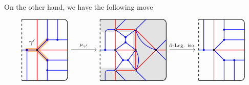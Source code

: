 On the other hand, we have the following move
\[
\begin{tikzcd}[column sep=3pc]
\begin{tikzpicture}[baseline=-.5ex, scale=0.5]
\draw[thick, dashed] (-0.5, 3) -- (-0.5, -3);
\draw[thick, rounded corners=5] (-0.5, 3) -- (4, 3) -- (4, -3) -- (-0.5, -3);
\clip[rounded corners=5] (-0.5, 3) -- (4, 3) -- (4, -3) -- (-0.5, -3);
\draw[cyclecolor1, opacity=0.5, line width=5, line cap=round] (1,0) -- (2,1) (1,0) -- (2,-1) (1,0) -- (0,0) node[midway, above, black, opacity=1] {$\cycle'$};
\draw[blue, thick, fill] (0, 0) circle (2pt) -- (0, -3);
\draw[red, thick] (1, 3) -- (1, -3);
\draw[red, thick] (1,0) -- (4, 0);
\draw[blue, thick, fill] 
(-0.5,0) -- (1, 0)
(1,0) -- ++(1, 1) circle (2pt) ++(0,0) -- +(0, 2) ++(0,0) -- ++(1,0) circle (2pt) -- +(0,2) ++(0,0) -- +(1,0)
(1,0) -- ++(1, -1) circle (2pt) ++(0,0) -- +(2,0) ++(0,0) -- ++(0,-1) circle (2pt) -- +(2,0) ++(0,0) -- ++(0,-1)
;
\draw[fill=white, thick] (1,0) circle (2pt);
\end{tikzpicture}
\arrow[r, "\mutation_{\cycle'}"] &
\begin{tikzpicture}[baseline=-.5ex, scale=0.5]
\draw[thick, dashed] (-0.5, 3) -- (-0.5, -3);
\draw[thick, rounded corners=5] (-0.5, 3) -- (6, 3) -- (6, -3) -- (-0.5, -3);
\clip[rounded corners=5] (-0.5, 3) -- (6, 3) -- (6, -3) -- (-0.5, -3);
\fill[opacity=0.1, rounded corners] (-1, 1.75) -- (2.75, 1.75) -- (2.75, -1.75) -- (-1, -1.75) -- (-1, -4) -- (7,-4) -- (7, 4) -- (-1, 4) -- cycle;
\draw[thick, red] 
(1,3) -- (1,2) rectangle (3,0) rectangle (1,-2) -- (1,-3)
(3,2) -- (5,0) -- (3,-2)
(5,0) -- (6,0)
;
\draw[thick, blue, fill]
(-0.5, 0) -- (0,0) circle (2pt) -- (1,0)
(1,2) -- ++(2,2)
(3,2) -- ++(2,2)
(5,0) -- ++(2,2)
(5,0) -- ++(2,-2)
(3,-2) -- ++(2,-2)
(1,-2) -- ++(2,-2)
(1,2) -- (2, 1.25) circle (2pt) -- (3, 2)
(2,1.25) -- (2, 0.75)
(1,0) -- (2, 0.75) circle (2pt) -- (3, 0)
(1,0) -- (1.75, -1) circle (2pt) -- (1, -2)
(1.75, -1) -- (2.25, -1)
(3,0) -- (2.25, -1) circle (2pt) -- (3,-2)
;
\draw[thick, blue, rounded corners] 
(0,0) -- (0, 2) -- (1,2)
(0, -4) -- (0, -2) -- (1, -2)
(3, -2) to[out=60,in=-60] (3,0)
(3, 2) to[out=-75, in=165] (5,0)
;
\draw[thick, fill=white]
(1,0) circle (2pt) (1,-2) circle (2pt) (1,2) circle (2pt)
(3,0) circle (2pt) (3,-2) circle (2pt) (3,2) circle (2pt)
(5,0) circle (2pt)
;
\end{tikzpicture}
\arrow[r, "\boundary\text{-Leg. iso.}"]&
\begin{tikzpicture}[baseline=-.5ex, scale=0.5, yscale=-1]
\draw[thick, dashed] (-0.5, 3) -- (-0.5, -3);
\draw[thick, rounded corners=5] (-0.5, 3) -- (4, 3) -- (4, -3) -- (-0.5, -3);
\clip[rounded corners=5] (-0.5, 3) -- (4, 3) -- (4, -3) -- (-0.5, -3);
\draw[blue, thick, fill] (0, 0) circle (2pt) -- (0, -3);
\draw[red, thick] (1, 3) -- (1, -3);
\draw[red, thick] (1,0) -- (4, 0);
\draw[blue, thick, fill] 
(-0.5,0) -- (1, 0)
(1,0) -- ++(1, 1) circle (2pt) ++(0,0) -- +(0, 2) ++(0,0) -- ++(1,0) circle (2pt) -- +(0,2) ++(0,0) -- +(1,0)
(1,0) -- ++(1, -1) circle (2pt) ++(0,0) -- +(2,0) ++(0,0) -- ++(0,-1) circle (2pt) -- +(2,0) ++(0,0) -- ++(0,-1)
;
\draw[fill=white, thick] (1,0) circle (2pt);
\end{tikzpicture}
\end{tikzcd}
\]
